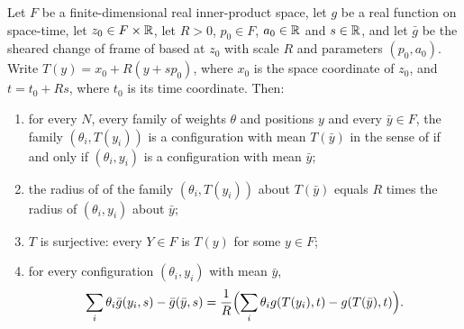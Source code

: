 \begin{helper}
Let $F$ be a finite-dimensional real inner-product space, let $g$ be a real
function on space-time, let $z_0\in F\times\mathbb{R}$, let $R>0$, $p_0\in F$,
$a_0\in\mathbb{R}$ and $s\in\mathbb{R}$, and let $\bar g$ be the sheared change of frame of
 based at $z_0$ with scale $R$ and parameters $(p_0,a_0)$.
Write $T(y)=x_0+R(y+sp_0)$, where $x_0$ is the space coordinate of $z_0$, and
$t=t_0+Rs$, where $t_0$ is its time coordinate. Then:
\begin{enumerate}
\item[(i)] for every $N$, every family of weights $\theta$ and positions $y$ and
every $\bar y\in F$, the family $(\theta_i,T(y_i))$ is a configuration with mean
$T(\bar y)$ in the sense of  if and only if
$(\theta_i,y_i)$ is a configuration with mean $\bar y$;
\item[(ii)] the radius of  of the family $(\theta_i,T(y_i))$
about $T(\bar y)$ equals $R$ times the radius of $(\theta_i,y_i)$ about
$\bar y$;
\item[(iii)] $T$ is surjective: every $Y\in F$ is $T(y)$ for some $y\in F$;
\item[(iv)] for every configuration $(\theta_i,y_i)$ with mean $\bar y$,
\[
  \sum_i\theta_i\bar g(y_i,s)-\bar g(\bar y,s)
    =\frac1R\Bigl(\sum_i\theta_ig(T(y_i),t)-g(T(\bar y),t)\Bigr).
\]
\end{enumerate}
\end{helper}
